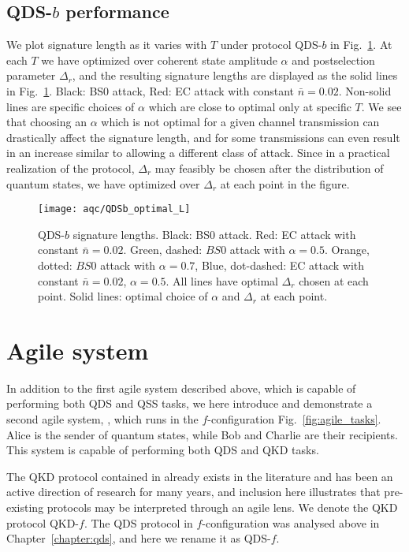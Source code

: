 \subsection{QDS-$b$ performance}

We plot signature length as it varies with $T$ under protocol QDS-$b$ in Fig.~\ref{fig:aqc_qdsb_lengths}. At each $T$ we have optimized over coherent state amplitude $\alpha$ and postselection parameter $\Delta_r$, and the resulting signature lengths are displayed as the solid lines in Fig.~\ref{fig:aqc_qdsb_lengths}. Black: BS$0$ attack, Red: EC attack with constant $\bar{n}=0.02$. Non-solid lines are specific choices of $\alpha$ which are close to optimal only at specific $T$. We see that choosing an $\alpha$ which is not optimal for a given channel transmission can drastically affect the signature length, and for some transmissions can even result in an increase similar to allowing a different class of attack. Since in a practical realization of the protocol, $\Delta_r$ may feasibly be chosen after the distribution of quantum states, we have optimized over $\Delta_r$ at each point in the figure.

\begin{figure}[htp]
\centering
\texttt{[image: aqc/QDSb\_optimal\_L]}
\caption{\label{fig:aqc_qdsb_lengths} QDS-$b$ signature lengths. Black: BS$0$ attack. Red: EC attack with constant $\bar{n} = 0.02$. Green, dashed: $BS0$ attack with $\alpha=0.5$. Orange, dotted: $BS0$ attack with $\alpha=0.7$, Blue, dot-dashed: EC attack with constant $\bar{n}=0.02$, $\alpha=0.5$. All lines have optimal $\Delta_r$ chosen at each point. Solid lines: optimal choice of $\alpha$ and $\Delta_r$ at each point.}
\end{figure}


\section{Agile system \systemF}

In addition to the first agile system described above, which is capable of performing both QDS and QSS tasks, we here introduce and demonstrate a second agile system, \systemF, which runs in the $f$-configuration Fig.~\ref{fig:agile_tasks}. Alice is the sender of quantum states, while Bob and Charlie are their recipients. This system is capable of performing both QDS and QKD tasks.

The QKD protocol contained in \systemF  already exists in the literature \cite{Leverrier2011a, Papanastasiou2018} and has been an active direction of research for many years, and inclusion here illustrates that pre-existing protocols may be interpreted through an agile lens. We denote the QKD protocol QKD-$f$. The QDS protocol in $f$-configuration was analysed above in Chapter~\ref{chapter:qds}, and here we rename it as QDS-$f$.

